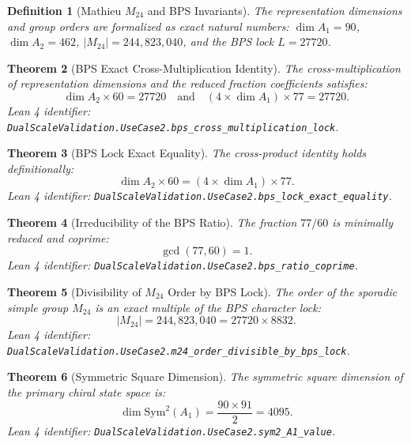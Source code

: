 \documentclass[11pt,a4paper]{article}
\newtheorem{theorem}{Theorem}
\newtheorem{definition}[theorem]{Definition}
\begin{document}
\begin{definition}[Mathieu $M_{24}$ and BPS Invariants]
The representation dimensions and group orders are formalized as exact natural numbers:
$\dim A_1 = 90$, $\dim A_2 = 462$, $|M_{24}| = 244,823,040$, and the BPS lock $L = 27720$.
\end{definition}

\begin{theorem}[BPS Exact Cross-Multiplication Identity]
The cross-multiplication of representation dimensions and the reduced fraction coefficients satisfies:
\begin{equation}
    \dim A_2 \times 60 = 27720 \quad \text{and} \quad (4 \times \dim A_1) \times 77 = 27720.
\end{equation}
\textit{Lean 4 identifier:} \texttt{DualScaleValidation.UseCase2.bps\_cross\_multiplication\_lock}.
\end{theorem}

\begin{theorem}[BPS Lock Exact Equality]
The cross-product identity holds definitionally:
\begin{equation}
    \dim A_2 \times 60 = (4 \times \dim A_1) \times 77.
\end{equation}
\textit{Lean 4 identifier:} \texttt{DualScaleValidation.UseCase2.bps\_lock\_exact\_equality}.
\end{theorem}

\begin{theorem}[Irreducibility of the BPS Ratio]
The fraction $77/60$ is minimally reduced and coprime:
\begin{equation}
    \gcd(77, 60) = 1.
\end{equation}
\textit{Lean 4 identifier:} \texttt{DualScaleValidation.UseCase2.bps\_ratio\_coprime}.
\end{theorem}

\begin{theorem}[Divisibility of $M_{24}$ Order by BPS Lock]
The order of the sporadic simple group $M_{24}$ is an exact multiple of the BPS character lock:
\begin{equation}
    |M_{24}| = 244,823,040 = 27720 \times 8832.
\end{equation}
\textit{Lean 4 identifier:} \texttt{DualScaleValidation.UseCase2.m24\_order\_divisible\_by\_bps\_lock}.
\end{theorem}

\begin{theorem}[Symmetric Square Dimension]
The symmetric square dimension of the primary chiral state space is:
\begin{equation}
    \dim \mathrm{Sym}^2(A_1) = \frac{90 \times 91}{2} = 4095.
\end{equation}
\textit{Lean 4 identifier:} \texttt{DualScaleValidation.UseCase2.sym2\_A1\_value}.
\end{theorem}
\end{document}
